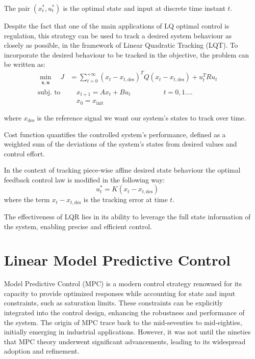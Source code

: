 \documentclass[a4paper,12pt,oneside]{book}
\begin{document}
The pair $(x_t^*, u_t^*)$ is the optimal state and input at discrete time instant $t$.

\bigskip
Despite the fact that one of the main applications of LQ optimal control is regulation, this strategy can be used to track a desired system behaviour as closely as possible, in the framework of Linear Quadratic Tracking (LQT).
To incorporate the desired behaviour to be tracked in the objective, the problem can be written as:
\begin{equation}
\begin{aligned}
	\min_{\substack{\boldsymbol{x}, \boldsymbol{u}}}\quad J &= \sum_{t=0}^{+\infty}  (x_t - x_{t,\text{des}})^T Q (x_t - x_{t,\text{des}}) + u_t^T R u_t  \\
	\text{subj. to} & \quad x_{t+1}  = A x_t + B u_t \hspace{2cm} t = 0, 1 \ldots. \\
    & \quad x_0 = x_{\text{init}}
\end{aligned}
\label{eq:LQR}
\end{equation}

where $x_{\text{des}}$ is the reference signal we want our system's states to track over time.

Cost function quantifies the controlled system's performance, defined as a weighted sum of the deviations of the system's states from desired values and control effort.

In the context of tracking piece-wise affine desired state behaviour the optimal feedback control law is modified in the following way:
\begin{equation}
    u_t^* = K (x_t - x_{t,\text{des}})
\label{Closed-loop_control_law}
\end{equation}
where the term $x_t - x_{t,\text{des}}$ is the tracking error at time $t$.

The effectiveness of LQR lies in its ability to leverage the full state information of the system, enabling precise and efficient control.


\section{Linear Model Predictive Control}
Model Predictive Control (MPC) is a modern control strategy renowned for its capacity to provide optimized responses while accounting for state and input constraints, such as saturation limits.
These constraints can be explicitly integrated into the control design, enhancing the robustness and performance of the system. 
The origin of MPC trace back to the mid-seventies to mid-eighties, initially emerging in industrial applications. 
However, it was not until the nineties that MPC theory underwent significant advancements, leading to its widespread adoption and refinement.
\end{document}
